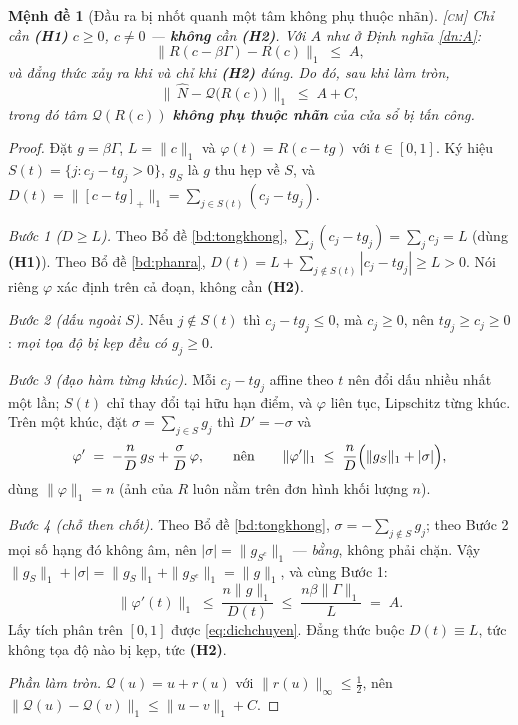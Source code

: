 \documentclass[11pt,a4paper]{article}
\newtheorem{menhde}[dinhly]{Mệnh đề}
\theoremstyle{remark}
\newcommand{\pos}[1]{\left[#1\right]_+}
\newcommand{\quant}{\mathcal{Q}}
\begin{document}
\begin{menhde}[Đầu ra bị nhốt quanh một tâm không phụ thuộc nhãn]
\label{md:bay}
\textsc{[cm]}\; Chỉ cần \textbf{(H1)} $c\ge0$, $c\ne0$ --- \textbf{không} cần
\textbf{(H2)}. Với $A$ như ở Định nghĩa \ref{dn:A}:
\begin{equation}
\bigl\|R(c-\beta\Gamma)-R(c)\bigr\|_1 \;\le\; A ,
\label{eq:dichchuyen}
\end{equation}
và \emph{đẳng thức xảy ra khi và chỉ khi} \textbf{(H2)} đúng. Do đó, sau khi
làm tròn,
\begin{equation}
\bigl\|\,\hat N-\quant\bigl(R(c)\bigr)\,\bigr\|_1 \;\le\; A+C ,
\label{eq:bay}
\end{equation}
trong đó tâm $\quant(R(c))$ \textbf{không phụ thuộc nhãn} của cửa sổ bị tấn
công.
\end{menhde}

\begin{proof}
Đặt $g=\beta\Gamma$, $L=\|c\|_1$ và $\varphi(t)=R(c-tg)$ với $t\in[0,1]$. Ký
hiệu $S(t)=\{j:c_j-tg_j>0\}$, $g_S$ là $g$ thu hẹp về $S$, và
$D(t)=\|\pos{c-tg}\|_1=\sum_{j\in S(t)}(c_j-tg_j)$.

\emph{Bước 1 ($D\ge L$).} Theo Bổ đề \ref{bd:tongkhong},
$\sum_j(c_j-tg_j)=\sum_j c_j=L$ (dùng \textbf{(H1)}). Theo Bổ đề
\ref{bd:phanra}, $D(t)=L+\sum_{j\notin S(t)}|c_j-tg_j|\ge L>0$. Nói riêng
$\varphi$ xác định trên cả đoạn, không cần \textbf{(H2)}.

\emph{Bước 2 (dấu ngoài $S$).} Nếu $j\notin S(t)$ thì $c_j-tg_j\le0$, mà
$c_j\ge0$, nên $tg_j\ge c_j\ge0$: \emph{mọi tọa độ bị kẹp đều có $g_j\ge0$.}

\emph{Bước 3 (đạo hàm từng khúc).} Mỗi $c_j-tg_j$ affine theo $t$ nên đổi dấu
nhiều nhất một lần; $S(t)$ chỉ thay đổi tại hữu hạn điểm, và $\varphi$ liên
tục, Lipschitz từng khúc. Trên một khúc, đặt $\sigma=\sum_{j\in S}g_j$ thì
$D'=-\sigma$ và
\[
\varphi' \;=\; -\frac{n}{D}\,g_S+\frac{\sigma}{D}\,\varphi,
\qquad\text{nên}\qquad
\|\varphi'\|_1\;\le\;\frac{n}{D}\Bigl(\|g_S\|_1+|\sigma|\Bigr),
\]
dùng $\|\varphi\|_1=n$ (ảnh của $R$ luôn nằm trên đơn hình khối lượng $n$).

\emph{Bước 4 (chỗ then chốt).} Theo Bổ đề \ref{bd:tongkhong},
$\sigma=-\sum_{j\notin S}g_j$; theo Bước 2 mọi số hạng đó không âm, nên
$|\sigma|=\|g_{S^c}\|_1$ --- \emph{bằng}, không phải chặn. Vậy
$\|g_S\|_1+|\sigma|=\|g_S\|_1+\|g_{S^c}\|_1=\|g\|_1$, và cùng Bước 1:
\[
\|\varphi'(t)\|_1\;\le\;\frac{n\|g\|_1}{D(t)}\;\le\;\frac{n\beta\|\Gamma\|_1}{L}\;=\;A .
\]
Lấy tích phân trên $[0,1]$ được \eqref{eq:dichchuyen}. Đẳng thức buộc
$D(t)\equiv L$, tức không tọa độ nào bị kẹp, tức \textbf{(H2)}.

\emph{Phần làm tròn.} $\quant(u)=u+r(u)$ với $\|r(u)\|_\infty\le\tfrac12$, nên
$\|\quant(u)-\quant(v)\|_1\le\|u-v\|_1+C$.
\end{proof}
\end{document}
